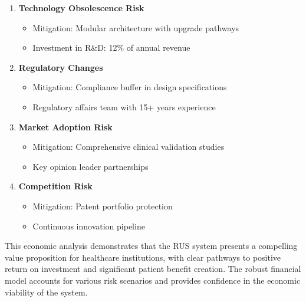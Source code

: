 \begin{enumerate}
    \item \textbf{Technology Obsolescence Risk}
    \begin{itemize}
        \item Mitigation: Modular architecture with upgrade pathways
        \item Investment in R\&D: 12\% of annual revenue
    \end{itemize}
    
    \item \textbf{Regulatory Changes}
    \begin{itemize}
        \item Mitigation: Compliance buffer in design specifications
        \item Regulatory affairs team with 15+ years experience
    \end{itemize}
    
    \item \textbf{Market Adoption Risk}
    \begin{itemize}
        \item Mitigation: Comprehensive clinical validation studies
        \item Key opinion leader partnerships
    \end{itemize}
    
    \item \textbf{Competition Risk}
    \begin{itemize}
        \item Mitigation: Patent portfolio protection
        \item Continuous innovation pipeline
    \end{itemize}
\end{enumerate}

This economic analysis demonstrates that the RUS system presents a compelling value proposition for healthcare institutions, with clear pathways to positive return on investment and significant patient benefit creation. The robust financial model accounts for various risk scenarios and provides confidence in the economic viability of the system.
